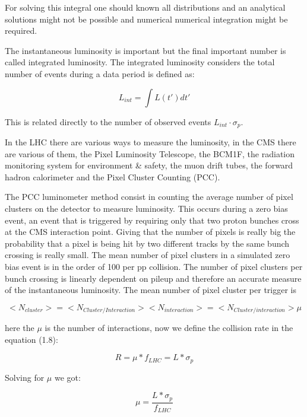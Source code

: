 For solving this integral one should known all distributions and an analytical solutions might not be possible and numerical numerical integration might be required.


The instantaneous luminosity is important  but the final important number is called integrated luminosity. The integrated luminosity considers the total number of events during a data period is defined as: 

\begin{equation}
 L_{int} = \int L (t') dt' 
\end{equation}

This is related directly to the number of observed events $L_{int} \cdot \sigma_{p}$.


In the LHC there are various ways to measure the luminosity, in the CMS there are various of them, the Pixel Luminosity Telescope, the BCM1F, the radiation monitoring system for environment & safety, the muon drift tubes, the forward hadron calorimeter and the Pixel Cluster Counting (PCC). 

The PCC luminometer method consist in counting the average number of pixel clusters on the detector to measure luminosity. This occurs during a zero bias event, an event that is triggered by requiring only that two proton bunches cross at the CMS interaction point. Giving that the number of pixels is really big the probability that a pixel is being hit by two different tracks by the same bunch crossing is really small. The mean number of pixel clusters in a simulated zero bias event is in the order of 100 per pp collision. The number of pixel clusters per bunch crossing is linearly dependent on pileup and therefore an accurate measure of the instantaneous luminosity.\cite{PCC1} The mean number of pixel cluster per trigger is 


\begin{equation}
<N_{cluster}> = <N_{Cluster/Interaction}> <N_{interaction}> = <N_{Cluster/interaction}> \mu 
\end{equation}

here the $\mu$ is the number of interactions, now we define the collision rate in the equation (1.8):

\begin{equation}
R = \mu * f_{LHC} = L * \sigma_{p}
\end{equation}

Solving for $\mu$ we got:

\begin{equation}
\mu = \frac{L * \sigma_{p}}{f_{LHC}} 
\end{equation}

